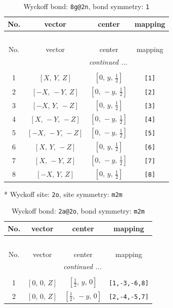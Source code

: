 \documentclass[fleqn,8pt]{jsarticle}
\begin{document}
\begin{longtable}{cccc}
\caption{Wyckoff bond: {\tt 8g@2n}, bond symmetry: {\tt 1}}
 \\
 \hline \hline
No. & vector & center & mapping \\ \hline \endfirsthead

\multicolumn{3}{l}{\tablename\ \thetable{}} \\
 \hline \hline
No. & vector & center & mapping \\ \hline \endhead

 \hline \hline
\multicolumn{3}{r}{\footnotesize\it continued ...} \\ \endfoot

 \hline \hline
\multicolumn{3}{r}{} \\ \endlastfoot

1 & $\left[ X,\, Y,\, Z \right]$ & $\left[ 0,\, y,\, \frac{1}{2} \right]$ & {\tt [1]} \\ \hline
2 & $\left[ - X,\, - Y,\, Z \right]$ & $\left[ 0,\, - y,\, \frac{1}{2} \right]$ & {\tt [2]} \\ \hline
3 & $\left[ - X,\, Y,\, - Z \right]$ & $\left[ 0,\, y,\, \frac{1}{2} \right]$ & {\tt [3]} \\ \hline
4 & $\left[ X,\, - Y,\, - Z \right]$ & $\left[ 0,\, - y,\, \frac{1}{2} \right]$ & {\tt [4]} \\ \hline
5 & $\left[ - X,\, - Y,\, - Z \right]$ & $\left[ 0,\, - y,\, \frac{1}{2} \right]$ & {\tt [5]} \\ \hline
6 & $\left[ X,\, Y,\, - Z \right]$ & $\left[ 0,\, y,\, \frac{1}{2} \right]$ & {\tt [6]} \\ \hline
7 & $\left[ X,\, - Y,\, Z \right]$ & $\left[ 0,\, - y,\, \frac{1}{2} \right]$ & {\tt [7]} \\ \hline
8 & $\left[ - X,\, Y,\, Z \right]$ & $\left[ 0,\, y,\, \frac{1}{2} \right]$ & {\tt [8]} \\
\end{longtable}
* Wyckoff site: {\tt 2o}, site symmetry: {\tt m2m}
\renewcommand{\arraystretch}{1.2}
\begin{longtable}{cccc}
\caption{Wyckoff bond: {\tt 2a@2o}, bond symmetry: {\tt m2m}}
 \\
 \hline \hline
No. & vector & center & mapping \\ \hline \endfirsthead

\multicolumn{3}{l}{\tablename\ \thetable{}} \\
 \hline \hline
No. & vector & center & mapping \\ \hline \endhead

 \hline \hline
\multicolumn{3}{r}{\footnotesize\it continued ...} \\ \endfoot

 \hline \hline
\multicolumn{3}{r}{} \\ \endlastfoot

1 & $\left[ 0,\, 0,\, Z \right]$ & $\left[ \frac{1}{2},\, y,\, 0 \right]$ & {\tt [1,-3,-6,8]} \\ \hline
2 & $\left[ 0,\, 0,\, Z \right]$ & $\left[ \frac{1}{2},\, - y,\, 0 \right]$ & {\tt [2,-4,-5,7]} \\
\end{longtable}
\end{document}
